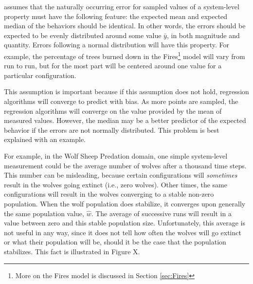 \fw assumes that the naturally occurring error for sampled values of a system-level property must have the following feature: the expected mean and expected median of the behaviors should be identical.
In other words, the errors should be expected to be evenly distributed around some value $\bar y$, in  both magnitude and quantity.
Errors following a normal distribution will have this property.
For example, the percentage of trees burned down in the Fires\footnote{More on the Fires model is discussed in Section \ref{sec:Fires}} model will vary from run to run, but for the most part will be centered around one value for a particular configuration.

This assumption is important because if this assumption does not hold, regression algorithms will converge to predict with bias.
As more points are sampled, the regression algorithms will converge on the value provided by the mean of measured values.
However, the median may be a better predictor of the expected behavior if the errors are not normally distributed.
This problem is best explained with an example.

For example, in the Wolf Sheep Predation domain, one simple system-level measurement could be the average number of wolves after a thousand time steps.
This number can be misleading, because certain configurations will \textit{sometimes} result in the wolves going extinct (i.e., zero wolves).
Other times, the same configurations will result in the wolves converging to a stable non-zero population.
When the wolf population does stabilize, it converges upon generally the same population value, $\hat w$.
The average of successive runs will result in a value between zero and this stable population size.
Unfortunately, this average is not useful in any way, since it does not tell how often the wolves will go extinct or what their population will be, should it be the case that the population stabilizes.
This fact is illustrated in Figure X.


